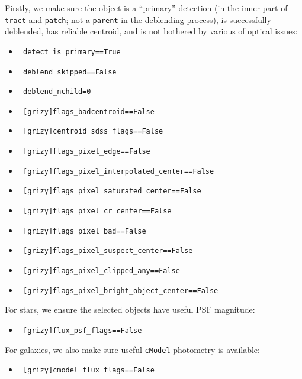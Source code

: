 \documentclass[useamsfonts]{pasj01}
\def\cmodel{\texttt{cModel}}
\def\tract{\texttt{tract}}
\begin{document}
    Firstly, we make sure the object is a ``primary'' detection (in the inner part 
    of \tract{} and \texttt{patch}; not a \texttt{parent} in the deblending process), 
    is successfully deblended, has reliable centroid, and is not bothered by various 
    of optical issues:

    \begin{itemize}

        \item[ ] \texttt{ detect\_is\_primary==True}
        \item[ ] \texttt{ deblend\_skipped==False }
        \item[ ] \texttt{ deblend\_nchild=0}
        \item[ ] \texttt{ [grizy]flags\_badcentroid==False }
        \item[ ] \texttt{ [grizy]centroid\_sdss\_flags==False }
        \item[ ] \texttt{ [grizy]flags\_pixel\_edge==False }
        \item[ ] \texttt{ [grizy]flags\_pixel\_interpolated\_center==False }
        \item[ ] \texttt{ [grizy]flags\_pixel\_saturated\_center==False }
        \item[ ] \texttt{ [grizy]flags\_pixel\_cr\_center==False }
        \item[ ] \texttt{ [grizy]flags\_pixel\_bad==False }
        \item[ ] \texttt{ [grizy]flags\_pixel\_suspect\_center==False }
        \item[ ] \texttt{ [grizy]flags\_pixel\_clipped\_any==False }
        \item[ ] \texttt{ [grizy]flags\_pixel\_bright\_object\_center==False }

    \end{itemize}
    
    \noindent For stars, we ensure the selected objects have useful PSF magnitude: 

    \begin{itemize}

        \item[ ] \texttt{ [grizy]flux\_psf\_flags==False }

    \end{itemize}
    
    \noindent For galaxies, we also make sure useful \cmodel{} photometry is available:

    \begin{itemize}

        \item[ ] \texttt{ [grizy]cmodel\_flux\_flags==False }

    \end{itemize}
\end{document}
